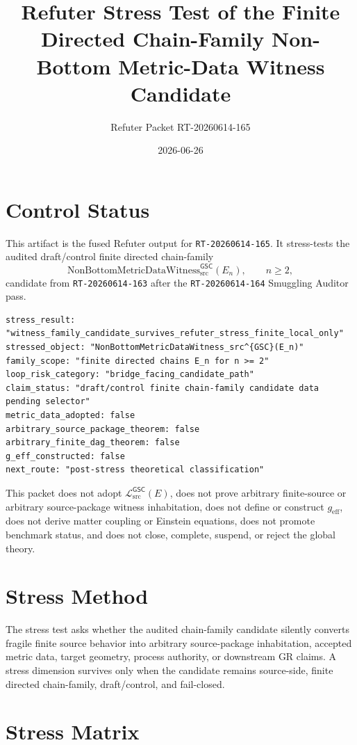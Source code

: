 \documentclass[11pt]{article}
\title{Refuter Stress Test of the Finite Directed Chain-Family Non-Bottom Metric-Data Witness Candidate}
\author{Refuter Packet RT-20260614-165}
\date{2026-06-26}
\newcommand{\Witness}{\mathrm{NonBottomMetricDataWitness}_{\mathrm{src}}^{\mathsf{GSC}}}
\newcommand{\MetricData}{\mathcal{L}_{\mathrm{src}}^{\mathsf{GSC}}}
\newcommand{\geff}{g_{\mathrm{eff}}}
\newcommand{\En}{E_n}
\begin{document}
\maketitle

\section{Control Status}

This artifact is the fused Refuter output for \texttt{RT-20260614-165}. It
stress-tests the audited draft/control finite directed chain-family
\[
  \Witness(\En),\qquad n\ge 2,
\]
candidate from \texttt{RT-20260614-163} after the
\texttt{RT-20260614-164} Smuggling Auditor pass.

\begin{verbatim}
stress_result: "witness_family_candidate_survives_refuter_stress_finite_local_only"
stressed_object: "NonBottomMetricDataWitness_src^{GSC}(E_n)"
family_scope: "finite directed chains E_n for n >= 2"
loop_risk_category: "bridge_facing_candidate_path"
claim_status: "draft/control finite chain-family candidate data pending selector"
metric_data_adopted: false
arbitrary_source_package_theorem: false
arbitrary_finite_dag_theorem: false
g_eff_constructed: false
next_route: "post-stress theoretical classification"
\end{verbatim}

This packet does not adopt \(\MetricData(E)\), does not prove arbitrary
finite-source or arbitrary source-package witness inhabitation, does not
define or construct \(\geff\), does not derive matter coupling or Einstein
equations, does not promote benchmark status, and does not close, complete,
suspend, or reject the global theory.

\section{Stress Method}

The stress test asks whether the audited chain-family candidate silently
converts fragile finite source behavior into arbitrary source-package
inhabitation, accepted metric data, target geometry, process authority, or
downstream GR claims. A stress dimension survives only when the candidate
remains source-side, finite directed chain-family, draft/control, and
fail-closed.

\section{Stress Matrix}
\end{document}
